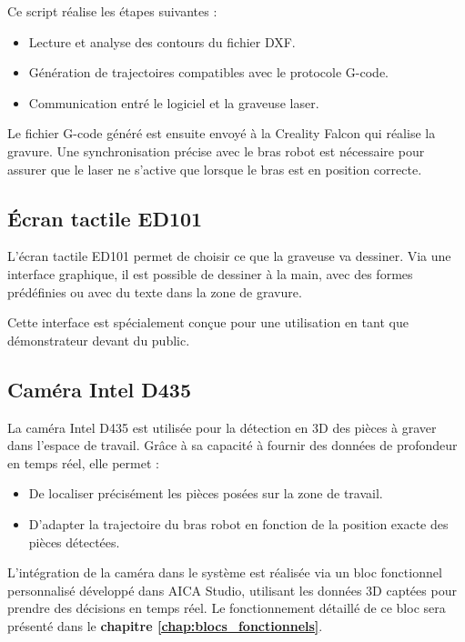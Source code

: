 Ce script réalise les étapes suivantes :
\begin{itemize}
    \item Lecture et analyse des contours du fichier DXF.
    \item Génération de trajectoires compatibles avec le protocole G-code.
    \item Communication entré le logiciel et la graveuse laser.
\end{itemize}

Le fichier G-code généré est ensuite envoyé à la Creality Falcon qui réalise la gravure. Une synchronisation précise avec le bras robot est nécessaire pour assurer que le laser ne s’active que lorsque le bras est en position correcte.

\subsection{Écran tactile ED101}

L’écran tactile ED101 permet de choisir ce que la graveuse va dessiner. Via une interface graphique, il est possible de dessiner à la main, avec des formes prédéfinies ou avec du texte dans la zone de gravure.

Cette interface est spécialement conçue pour une utilisation en tant que démonstrateur devant du public.

\subsection{Caméra Intel D435}

La caméra Intel D435 est utilisée pour la détection en 3D des pièces à graver dans l’espace de travail. Grâce à sa capacité à fournir des données de profondeur en temps réel, elle permet :
\begin{itemize}
    \item De localiser précisément les pièces posées sur la zone de travail.
    \item D’adapter la trajectoire du bras robot en fonction de la position exacte des pièces détectées.
\end{itemize}

L’intégration de la caméra dans le système est réalisée via un bloc fonctionnel personnalisé développé dans AICA Studio, utilisant les données 3D captées pour prendre des décisions en temps réel. Le fonctionnement détaillé de ce bloc sera présenté dans le \textbf{chapitre \ref{chap:blocs_fonctionnels}}.


